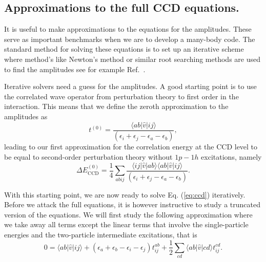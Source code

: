   \subsection{Approximations to the full CCD equations.}
  It is useful to make approximations to the equations for the
  amplitudes. These serve as important benchmarks when we are to develop a many-body code.
The standard method for solving these equations is to
  set up an iterative scheme where method's like Newton's method or
  similar root searching methods are used to find the amplitudes see for example Ref.~\cite{hagen2007}.

  Iterative solvers need a guess for the amplitudes. A good starting
  point is to use the correlated wave operator from perturbation
  theory to first order in the interaction.  This means that we define
  the zeroth approximation to the amplitudes as
  \[
  t^{(0)}=\frac{\langle ab \vert \hat{v} \vert ij
    \rangle}{\left(\epsilon_i+\epsilon_j-\epsilon_a-\epsilon_b\right)},
  \]
  leading to our first approximation for the correlation energy at the
  CCD level to be equal to second-order perturbation theory without
  $1p-1h$ excitations, namely
  \[
  \Delta E_{\mathrm{CCD}}^{(0)}=\frac{1}{4}\sum_{abij} \frac{\langle
    ij \vert \hat{v} \vert ab \rangle \langle ab \vert \hat{v} \vert
    ij
    \rangle}{\left(\epsilon_i+\epsilon_j-\epsilon_a-\epsilon_b\right)}.
  \]

  With this starting point, we are now ready to solve
  Eq. (\ref{eq:ccd}) iteratively. Before we attack the full equations,
  it is however instructive to study a truncated version of the
  equations. We will first study the following approximation where we
  take away all terms except the linear terms that involve the
  single-particle energies and the two-particle intermediate
  excitations, that is
  \begin{equation}
  0 = \langle ab \vert \hat{v} \vert ij \rangle +
  \left(\epsilon_a+\epsilon_b-\epsilon_i-\epsilon_j\right)t_{ij}^{ab}+\frac{1}{2}\sum_{cd}
  \langle ab \vert \hat{v} \vert cd \rangle t_{ij}^{cd}.
  \label{eq:ccd1}
  \end{equation}

